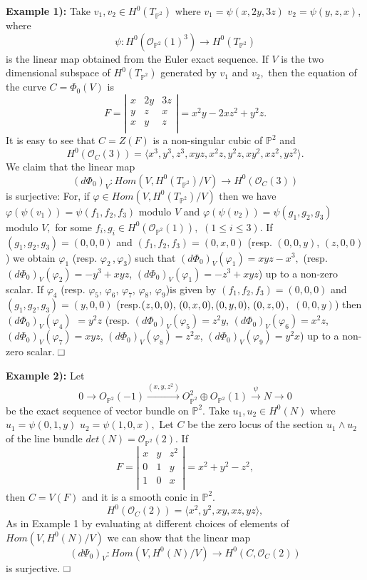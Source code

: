 \documentclass[11pt]{amsart}
\theoremstyle{definition}
\renewcommand\square{\frame{\phantom{{\large x}}}}
\begin{document}
{\bf Example 1):}
Take $v_{1},v_{2} \in H^0(T_{\mathbb{P}^2})$ where $v_{1}=\psi(x,2y,3z)$ $v_{2}=\psi(y,z,x)$, where  
$$\psi: H^0(\mathcal O_{\mathbb{P}^2}(1)^3) \to H^0( T_{\mathbb{P}^2} )$$
is the linear map obtained from the Euler exact sequence. If $V$
is the two dimensional subspace of $H^0( T_{\mathbb{P}^2} )$ generated by $v_{1}$ and $v_{2},$
then the equation of the curve $C=\Phi_0(V)$ is
\[
F=  \left |   \begin{array}{ccc}x&2y&3z\\y&z&x\\x&y&z\\ \end{array} \right |  = x^2y-2xz^2+y^2z. 
\] 
It is easy to see that   $C=Z(F)$ is a non-singular cubic of $\mathbb{P}^2$ and 
$$H^0(\mathcal O_{C}(3))=\langle x^3,y^3,z^3,xyz,x^2z,y^2z,xy^2,xz^2,yz^2\rangle .$$ 
We claim that 
the linear map 
\[ (d\Phi_0)_V: Hom(V,H^0(T_{\mathbb{P}^2})/V) \to H^0(\mathcal O_{C}(3)) 
\]
is surjective:
For, if $\varphi \in Hom(V,H^0(T_{\mathbb{P}^2})/V) $ then we have 
$\varphi(\psi(v_{1}))=\psi(f_{1},f_{2},f_{3})$ modulo $V$ and 
$\varphi(\psi(v_{2}))=\psi(g_{1},g_{2},g_{3})$ modulo $V,$ for some 
$f_i,g_i \in H^0(\mathcal O_{\mathbb{P}^2}(1)), \,\, (1\leq i \leq 3).$ 
 If 
 $(g_1,g_2,g_3) = (0,0,0)$ and $(f_{1},f_{2},f_{3})=(0,x,0)$ 
 (resp. $(0,0,y)$, $(z,0,0)$) we obtain $\varphi_{1}$ 
 (resp. $ \varphi_{2}\,$,$\,\varphi_{3}$) such that  
 $(d\Phi_0)_V(\varphi_{1})= xyz-x^3,$
(resp. $(d\Phi_0)_V(\varphi_{2})= -y^3+xyz$, 
$(d\Phi_0)_V(\varphi_{1})= -z^3 +xyz$) up to a non-zero scalar. 
If $\varphi_{4}$ (resp. $\varphi_{5}$, $\varphi_{6}$,
$\varphi_{7}$, $\varphi_{8}$, $\varphi_{9}$)is given by 
$(f_1,f_2,f_3)=(0,0,0)$ and 
$(g_{1},g_{2},g_{3})=(y,0,0)$ (resp.$(z,0,0),\,(0,x,0),\,\\ (0,y,0),\,(0,z,0)$,
$\,(0,0,y) $) then 
$(d\Phi_0)_V(\varphi_{4})$ $=y^2z$ 
(resp. $(d\Phi_0)_V(\varphi_{5})=z^2y$,
$(d\Phi_0)_V(\varphi_{6})= x^2z$, $(d\Phi_0)_V(\varphi_{7}) =xyz$,
 $(d\Phi_0)_V(\varphi_{8})= z^2x$, $(d\Phi_0)_V(\varphi_{9})=y^2x$) up to
a non-zero scalar.
$\hfill{\square}$

{\bf Example 2):}
Let
\[ 0 \to O_{\mathbb{P}^2}(-1) \stackrel{(x,y,z^2)}{\longrightarrow} 
O_{\mathbb{P}^2}^2 \oplus O_{\mathbb{P}^2}(1) \stackrel{\psi}{\to} 
N \to 0 \]
be the exact sequence of vector bundle on ${\mathbb{P}^2}.$
Take $u_{1},u_{2} \in H^0(N)$ where $u_{1}=\psi(0, 1, y)$ 
$u_{2}=\psi(1,0,x),$ 
Let $C$ be the zero locus of the section $u_1\wedge u_2$ of the line bundle $det(N) = {\mathcal O}_{\mathbb{P}^2}(2).$
If  
\[ 
F=  \left |  \begin{array}{ccc}x& y& z^2\\ 0& 1 & y\\ 1& 0 & x\\ \end{array} \right |  = x^2 +y^2-z^2,
\] 
then $C=V(F)$ and it is a smooth conic in $\mathbb{P}^2.$
$$H^0(\mathcal O_{C}(2))=\langle x^2,y^2,xy,xz,yz\rangle ,$$ 
As in Example 1 by evaluating at different choices of elements of 
$Hom(V, H^0(N)/V)$ we can show that the linear map
\[
(d\Psi_0)_V : Hom(V, H^0(N)/V) \to H^0(C,\mathcal{O}_C(2))
\]
is surjective. $\hfill{\square}$
\end{document}
